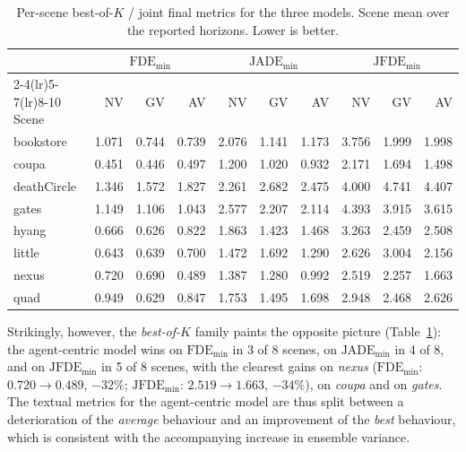 \documentclass[11pt,a4paper]{article}
\begin{document}
\begin{table}[htpb]
    \centering
    \caption{Per-scene best-of-$K$ / joint final metrics for the three models.
    Scene mean over the reported horizons. Lower is better.
    \label{tab:min-family}}
    \small
    \setlength{\tabcolsep}{4pt}
    \begin{tabular}{l rrr rrr rrr}
        \toprule
        & \multicolumn{3}{c}{$\mathrm{FDE_{min}}$}
        & \multicolumn{3}{c}{$\mathrm{JADE_{min}}$}
        & \multicolumn{3}{c}{$\mathrm{JFDE_{min}}$} \\
        \cmidrule(lr){2-4}\cmidrule(lr){5-7}\cmidrule(lr){8-10}
        Scene & NV & GV & AV & NV & GV & AV & NV & GV & AV \\
        \midrule
        bookstore  & 1.071 & 0.744 & 0.739 & 2.076 & 1.141 & 1.173 & 3.756 & 1.999 & 1.998 \\
        coupa      & 0.451 & 0.446 & 0.497 & 1.200 & 1.020 & 0.932 & 2.171 & 1.694 & 1.498 \\
        deathCircle& 1.346 & 1.572 & 1.827 & 2.261 & 2.682 & 2.475 & 4.000 & 4.741 & 4.407 \\
        gates      & 1.149 & 1.106 & 1.043 & 2.577 & 2.207 & 2.114 & 4.393 & 3.915 & 3.615 \\
        hyang      & 0.666 & 0.626 & 0.822 & 1.863 & 1.423 & 1.468 & 3.263 & 2.459 & 2.508 \\
        little     & 0.643 & 0.639 & 0.700 & 1.472 & 1.692 & 1.290 & 2.626 & 3.004 & 2.156 \\
        nexus      & 0.720 & 0.690 & 0.489 & 1.387 & 1.280 & 0.992 & 2.519 & 2.257 & 1.663 \\
        quad       & 0.949 & 0.629 & 0.847 & 1.753 & 1.495 & 1.698 & 2.948 & 2.468 & 2.626 \\
        \bottomrule
    \end{tabular}
\end{table}

Strikingly, however, the \emph{best-of-$K$} family paints the opposite picture
(Table~\ref{tab:min-family}): the agent-centric model wins on
$\mathrm{FDE_{min}}$ in 3 of 8 scenes, on $\mathrm{JADE_{min}}$ in 4 of 8, and
on $\mathrm{JFDE_{min}}$ in 5 of 8 scenes, with the clearest gains on
\emph{nexus} ($\mathrm{FDE_{min}}$: $0.720 \to 0.489$, $-32\%$; $\mathrm{JFDE_{min}}$:
$2.519 \to 1.663$, $-34\%$), on \emph{coupa} and on \emph{gates}. The textual
metrics for the agent-centric model are thus split between a deterioration of
the \emph{average} behaviour and an improvement of the \emph{best} behaviour,
which is consistent with the accompanying increase in ensemble variance.
\end{document}
